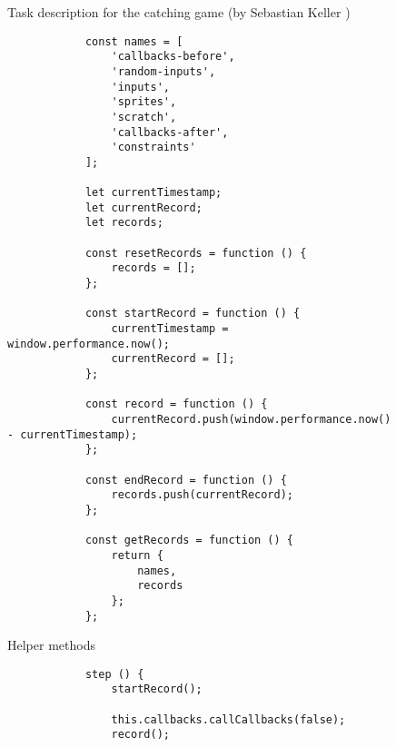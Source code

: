 \begin{figure}[htpb]
    \centering
    \caption{Task description for the catching game (by Sebastian Keller \cite{keller})}
    \label{fig:catching_game_task_description}
\end{figure}

\begin{listing}[htpb]
    \centering

    \begin{subfigure}[b]{.40\textwidth}
        \begin{verbatim}
            const names = [
                'callbacks-before',
                'random-inputs',
                'inputs',
                'sprites',
                'scratch',
                'callbacks-after',
                'constraints'
            ];

            let currentTimestamp;
            let currentRecord;
            let records;

            const resetRecords = function () {
                records = [];
            };

            const startRecord = function () {
                currentTimestamp = window.performance.now();
                currentRecord = [];
            };

            const record = function () {
                currentRecord.push(window.performance.now() - currentTimestamp);
            };

            const endRecord = function () {
                records.push(currentRecord);
            };

            const getRecords = function () {
                return {
                    names,
                    records
                };
            };
        \end{verbatim}
        \vspace{-\bigskipamount}
        \caption{Helper methods}
    \end{subfigure}
    \hspace{.08\textwidth}
    \begin{subfigure}[b]{.40\textwidth}
        \begin{verbatim}
            step () {
                startRecord();

                this.callbacks.callCallbacks(false);
                record();


\end{verbatim}
\end{subfigure}
\end{listing}
